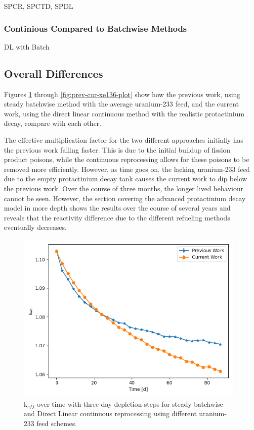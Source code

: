 SPCR, SPCTD, SPDL


\subsubsection{Continious Compared to Batchwise Methods}

DL with Batch



\subsection{Overall Differences}

Figures \ref{fig:prev-cur-keff-plot} through  \ref{fig:prev-cur-xe136-plot} show how the previous work, using steady batchwise method with the average uranium-233 feed, and the current work, using the direct linear continuous method with the realistic protactinium decay, compare with each other. 

The effective multiplication factor for the two different approaches initially has the previous work falling faster. This is due to the initial buildup of fission product poisons, while the continuous reprocessing allows for these poisons to be removed more efficiently. However, as time goes on, the lacking uranium-233 feed due to the empty protactinium decay tank causes the current work to dip below the previous work. Over the course of three months, the longer lived behaviour cannot be seen. However, the section covering the advanced protactinium decay model in more depth shows the results over the course of several years and reveals that the reactivity difference due to the different refueling methods eventually decreases.

\begin{figure}[H]
  \centering
  \includegraphics[scale=0.5]{images/prev-cur-keff.png}
  \caption{k$_{eff}$ over time with three day depletion steps for steady batchwise and Direct Linear continuous reprocessing using different uranium-233 feed schemes.}
   \label{fig:prev-cur-keff-plot}
\end{figure}

